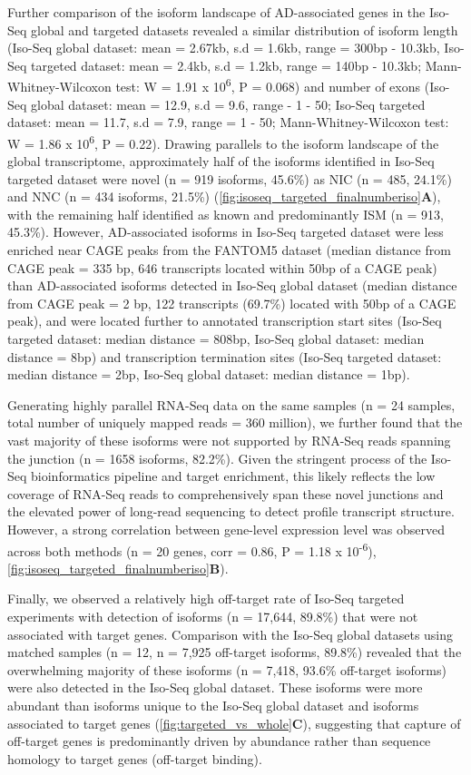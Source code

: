 Further comparison of the isoform landscape of AD-associated genes in the Iso-Seq global and targeted datasets revealed a similar distribution of isoform length (Iso-Seq global dataset: mean = 2.67kb, s.d = 1.6kb, range = 300bp - 10.3kb, Iso-Seq targeted dataset: mean = 2.4kb, s.d = 1.2kb, range = 140bp - 10.3kb; Mann-Whitney-Wilcoxon test: W = 1.91 x 10\textsuperscript{6}, P = 0.068) and number of exons (Iso-Seq global dataset: mean = 12.9, s.d = 9.6, range - 1 - 50; Iso-Seq targeted dataset: mean = 11.7, s.d = 7.9, range = 1 - 50; Mann-Whitney-Wilcoxon test: W = 1.86 x 10\textsuperscript{6}, P = 0.22). Drawing parallels to the isoform landscape of the global transcriptome, approximately half of the isoforms identified in Iso-Seq targeted dataset were novel (n = 919 isoforms, 45.6\%) as NIC (n = 485, 24.1\%) and NNC (n = 434 isoforms, 21.5\%) (\cref{fig:isoseq_targeted_finalnumberiso}\textbf{A}), with the remaining half identified as known and predominantly ISM (n = 913, 45.3\%). However, AD-associated isoforms in Iso-Seq targeted dataset were less enriched near CAGE peaks from the FANTOM5 dataset (median distance from CAGE peak = 335 bp, 646 transcripts located within 50bp of a CAGE peak) than AD-associated isoforms detected in Iso-Seq global dataset (median distance from CAGE peak = 2 bp, 122 transcripts (69.7\%) located with 50bp of a CAGE peak), and were located further to annotated transcription start sites (Iso-Seq targeted dataset: median distance = 808bp, Iso-Seq global dataset: median distance = 8bp) and transcription termination sites (Iso-Seq targeted dataset: median distance = 2bp, Iso-Seq global dataset: median distance = 1bp). 

Generating highly parallel RNA-Seq data on the same samples (n = 24 samples, total number of uniquely mapped reads = 360 million), we further found that the vast majority of these isoforms were not supported by RNA-Seq reads spanning the junction (n = 1658 isoforms, 82.2\%). Given the stringent process of the Iso-Seq bioinformatics pipeline and target enrichment, this likely reflects the low coverage of RNA-Seq reads to comprehensively span these novel junctions and the elevated power of long-read sequencing to detect profile transcript structure. However, a strong correlation between gene-level expression level was observed across both methods (n = 20 genes, corr = 0.86, P = 1.18 x 10\textsuperscript{-6}), \cref{fig:isoseq_targeted_finalnumberiso}\textbf{B}). 

Finally, we observed a relatively high off-target rate of Iso-Seq targeted experiments with detection of isoforms (n = 17,644, 89.8\%) that were not associated with target genes. Comparison with the Iso-Seq global datasets using matched samples (n = 12, n = 7,925 off-target isoforms, 89.8\%) revealed that the overwhelming majority of these isoforms (n = 7,418, 93.6\% off-target isoforms) were also detected in the Iso-Seq global dataset. These isoforms were more abundant than isoforms unique to the Iso-Seq global dataset and isoforms associated to target genes (\cref{fig:targeted_vs_whole}\textbf{C}), suggesting that capture of off-target genes is predominantly driven by abundance rather than sequence homology to target genes (off-target binding).  

